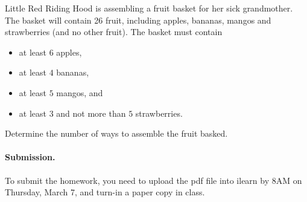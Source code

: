 \documentclass{article}
\begin{document}
\begin{problem}
Little Red Riding Hood is assembling a fruit basket for her sick grandmother.
The basket will contain 26 fruit, including
apples, bananas, mangos and strawberries (and no other fruit). 
The basket must contain
%
\begin{itemize}
	\item at least $6$ apples, 
	\item at least $4$ bananas, 
	\item at least $5$ mangos, and
	\item at least $3$ and not more than $5$ strawberries. 
\end{itemize}
%
Determine the number of ways to assemble the fruit basked.
\end{problem}


\vskip 0.1in
\paragraph{Submission.}
To submit the homework, you need to upload the pdf file into ilearn by 8AM on Thursday, March 7,
and turn-in a paper copy in class.
\end{document}
